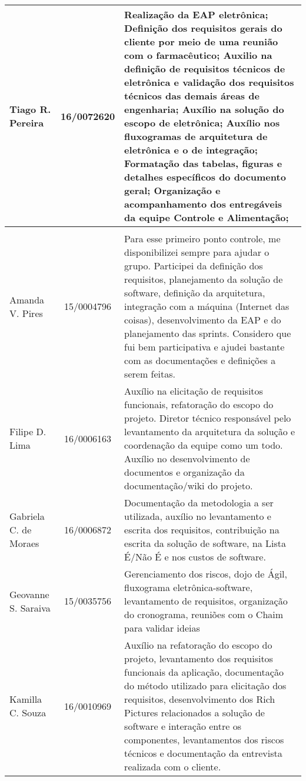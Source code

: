 \begin{table}[H]
\begin{adjustbox}{max width = \textwidth}
\begin{tabular}{|G{4cm}|c|L{10cm}|}
        Tiago R. Pereira & 16/0072620 &   Realização da EAP eletrônica; Definição dos requisitos gerais do cliente por meio de uma reunião com o farmacêutico; Auxilio na definição de requisitos técnicos de eletrônica e validação dos requisitos técnicos das demais áreas de engenharia; Auxílio na solução do escopo de eletrônica; Auxílio nos fluxogramas de arquitetura de eletrônica e o de integração; Formatação das tabelas, figuras e detalhes específicos do documento geral; Organização e acompanhamento dos entregáveis da equipe Controle e Alimentação;  \\ \hline
         \\ \hline
        Amanda V. Pires & 15/0004796 &  Para esse primeiro ponto controle, me disponibilizei sempre para ajudar o grupo. Participei da definição dos requisitos, planejamento da solução de software, definição da arquitetura, integração com a máquina (Internet das coisas), desenvolvimento da EAP e do planejamento das sprints. Considero que fui bem participativa e ajudei bastante com as documentações e definições a serem feitas.\\ \hline
        Filipe D. Lima & 16/0006163 &  Auxílio na elicitação de requisitos funcionais, refatoração do escopo do projeto. Diretor técnico responsável pelo levantamento da arquitetura da solução e coordenação da equipe como um todo. Auxílio no desenvolvimento de documentos e organização da documentação/wiki do projeto. \\ \hline
        Gabriela C. de Moraes &  16/0006872 &  Documentação da metodologia a ser utilizada, auxílio no levantamento e escrita dos requisitos, contribuição na escrita da solução de software, na Lista É/Não É e nos custos de software.  \\ \hline
        Geovanne S. Saraiva &  15/0035756 &  Gerenciamento dos riscos, dojo de Ágil, fluxograma eletrônica-software, levantamento de requisitos, organização do cronograma, reuniões com o Chaim para validar ideias \\ \hline
        Kamilla C. Souza &  16/0010969 &  Auxílio na refatoração do escopo do projeto, levantamento dos requisitos funcionais da aplicação, documentação do método utilizado para elicitação dos requisitos, desenvolvimento dos Rich Pictures relacionados a solução de software e interação entre os componentes, levantamentos dos riscos técnicos e documentação da entrevista realizada com o cliente. \\ \hline
        \end{tabular}
    \end{adjustbox}
\end{table}
